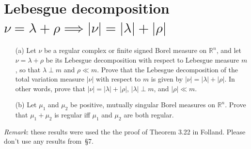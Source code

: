 \documentclass[lang=cn,11pt]{elegantbook}
\begin{document}
\section{Lebesgue decomposition $\nu=\lambda+\rho\implies |\nu|=|\lambda|+|\rho|$}
  \begin{itemize}
  \item[(a)]    Let $\nu$ be a regular complex or finite signed Borel measure on $\mathbb{R}^n$, and let $\nu=\lambda+\rho$ be its Lebesgue decomposition with respect to Lebesgue measure $m$, so that $\lambda\perp m$ and $\rho\ll m$. Prove that the Lebesgue decomposition of the total variation measure $|\nu|$ with respect to $m$ is given by $|\nu|=|\lambda|+|\rho|$. In other words, prove that $|\nu|=|\lambda|+|\rho|$, $|\lambda|\perp m$, and $|\rho|\ll m$.
  \item[(b)]Let $\mu_1$ and $\mu_2$ be positive, mutually singular Borel measures on $\mathbb{R}^n$. Prove that $\mu_1+\mu_2$ is regular iff $\mu_1$ and $\mu_2$ are both regular. 
  \end{itemize}
\textit{Remark}: these results were used the the proof of Theorem 3.22 in Folland. Please don't use any results from~\S7.
\end{document}
